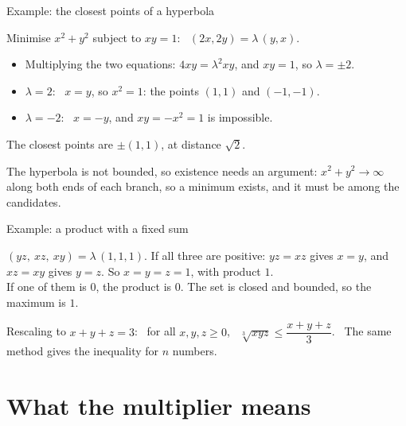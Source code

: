 \documentclass[10pt]{wosm-slides}
\begin{document}
\begin{frame}{Example: the closest points of a hyperbola}
  \begin{example}[Closest points of $xy = 1$ to the origin]
    Minimise $x^2 + y^2$ subject to $xy = 1$: \ $(2x, 2y) = \lambda\,(y, x)$.
    \pause
    \begin{itemize}
      \item Multiplying the two equations: $4xy = \lambda^2 xy$, and $xy = 1$, so $\lambda = \pm 2$.
      \item $\lambda = 2$: \ $x = y$, so $x^2 = 1$: the points $(1, 1)$ and $(-1, -1)$.
      \item $\lambda = -2$: \ $x = -y$, and $xy = -x^2 = 1$ is impossible.
    \end{itemize}
    \pause
    The closest points are $\pm(1, 1)$, at distance $\sqrt2$.
  \end{example}
  \pause
  {\small The hyperbola is not bounded, so existence needs an argument: $x^2 + y^2 \to \infty$ along both
  ends of each branch, so a minimum exists, and it must be among the candidates.\par}
\end{frame}

\begin{frame}{Example: a product with a fixed sum}
  \begin{example}[Maximise $xyz$ subject to $x + y + z = 3$, \ $x, y, z \ge 0$]
    $(yz, \ xz, \ xy) = \lambda\,(1, 1, 1)$.
    \pause
    If all three are positive: $yz = xz$ gives $x = y$, and $xz = xy$ gives $y = z$. So
    $x = y = z = 1$, with product $1$.
    \pause
    \\[0.3em] If one of them is $0$, the product is $0$. The set is closed and bounded, so the
    maximum is $1$.
  \end{example}
  \pause
  \begin{remark}
    Rescaling to $x + y + z = 3$: \ for all $x, y, z \ge 0$, \ $\sqrt[3]{xyz} \le \dfrac{x + y + z}{3}$. \ The same method gives the
    inequality for $n$ numbers.
  \end{remark}
\end{frame}

\section{What the multiplier means}
\end{document}
